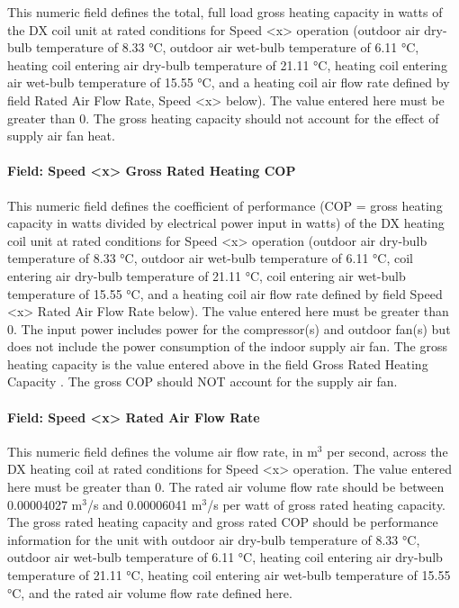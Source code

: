 This numeric field defines the total, full load gross heating capacity in watts of the DX coil unit at rated conditions for Speed \textless{}x\textgreater{} operation (outdoor air dry-bulb temperature of 8.33 °C, outdoor air wet-bulb temperature of 6.11 °C, heating coil entering air dry-bulb temperature of 21.11 °C, heating coil entering air wet-bulb temperature of 15.55 °C, and a heating coil air flow rate defined by field Rated Air Flow Rate, Speed \textless{}x\textgreater{} below). The value entered here must be greater than 0. The gross heating capacity should not account for the effect of supply air fan heat.

\paragraph{Field: Speed \textless{}x\textgreater{} Gross Rated Heating COP}\label{field-speed-x-gross-rated-heating-cop}

This numeric field defines the coefficient of performance (COP = gross heating capacity in watts divided by electrical power input in watts) of the DX heating coil unit at rated conditions for Speed \textless{}x\textgreater{} operation (outdoor air dry-bulb temperature of 8.33 °C, outdoor air wet-bulb temperature of 6.11 °C, coil entering air dry-bulb temperature of 21.11 °C, coil entering air wet-bulb temperature of 15.55 °C, and a heating coil air flow rate defined by field Speed \textless{}x\textgreater{} Rated Air Flow Rate below). The value entered here must be greater than 0. The input power includes power for the compressor(s) and outdoor fan(s) but does not include the power consumption of the indoor supply air fan. The gross heating capacity is the value entered above in the field Gross Rated Heating Capacity . The gross COP should NOT account for the supply air fan.

\paragraph{Field: Speed \textless{}x\textgreater{} Rated Air Flow Rate}\label{field-speed-x-rated-air-flow-rate-1}

This numeric field defines the volume air flow rate, in m\(^{3}\) per second, across the DX heating coil at rated conditions for Speed \textless{}x\textgreater{} operation. The value entered here must be greater than 0. The rated air volume flow rate should be between 0.00004027 m\(^{3}\)/s and 0.00006041 m\(^{3}\)/s per watt of gross rated heating capacity. The gross rated heating capacity and gross rated COP should be performance information for the unit with outdoor air dry-bulb temperature of 8.33 °C, outdoor air wet-bulb temperature of 6.11 °C, heating coil entering air dry-bulb temperature of 21.11 °C, heating coil entering air wet-bulb temperature of 15.55 °C, and the rated air volume flow rate defined here.

